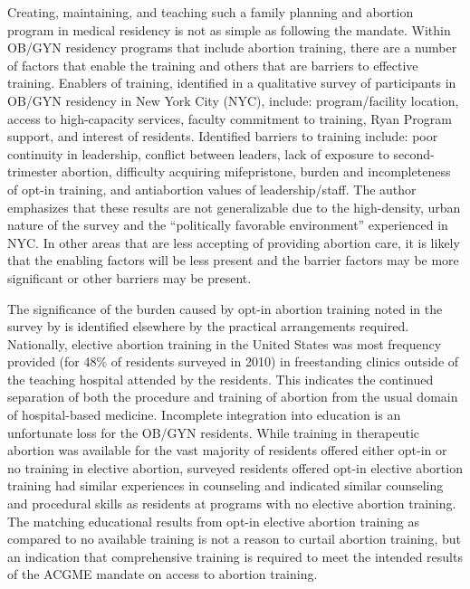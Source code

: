 \documentclass[letterpaper, 12pt]{article}
\begin{document}
Creating, maintaining, and teaching such a family planning and abortion program in medical residency is not as simple as following the mandate. Within OB/GYN residency programs that include abortion training, there are a number of factors that enable the training and others that are barriers to effective training.
Enablers of training, identified in a qualitative survey of participants in OB/GYN residency in New York City (NYC), include: program/facility location, access to high-capacity services, faculty commitment to training, Ryan Program \autocite{bixby_center_for_global_reproductive_health_education_????} \autocite{bixby_center_for_global_reproductive_health_home_????} \autocite{steinauer_benefits_2013} support, and interest of residents. \autocite[pg. 240--2]{guiahi_enablers_2013}
Identified barriers to training include: poor continuity in leadership, conflict between leaders, lack of exposure to second-trimester abortion, difficulty acquiring mifepristone,  burden and incompleteness of opt-in training, and antiabortion values of leadership/staff. \autocite[pg. 242]{guiahi_enablers_2013}
The author emphasizes that these results are not generalizable due to the high-density, urban nature of the survey and the ``politically favorable environment'' experienced in NYC. \autocite[pg. 243]{guiahi_enablers_2013}
In other areas that are less accepting of providing abortion care, it is likely that the enabling factors will be less present and the barrier factors may be more significant or other barriers may be present.

The significance of the burden caused by opt-in abortion training noted in the survey by \citeauthor{guiahi_enablers_2013} is identified elsewhere by the practical arrangements required.
Nationally, elective abortion training in the United States was most frequency provided (for 48\% of residents surveyed in 2010) in freestanding clinics outside of the teaching hospital attended by the residents. \autocite[pg. 274]{turk_availability_2014} This indicates the continued separation of both the procedure and training of abortion from the usual domain of hospital-based medicine. Incomplete integration into education is an unfortunate loss for the OB/GYN residents.
While training in therapeutic abortion was available for the vast majority of residents offered either opt-in or no training in elective abortion, surveyed residents offered opt-in elective abortion training had similar experiences in counseling and indicated similar counseling and procedural skills as residents at programs with no elective abortion training. \autocite[pg. 275--6]{turk_availability_2014}
The matching educational results from opt-in elective abortion training as compared to no available training is not a reason to curtail abortion training, but an indication that comprehensive training is required to meet the intended results of the ACGME mandate on access to abortion training.
\end{document}
